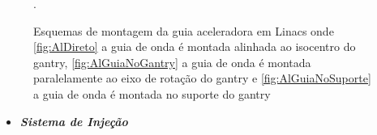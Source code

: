 \documentclass[11pt,a4paper]{article}
\begin{document}
            \begin{figure}[h]
                \centering
                \caption{Esquemas de montagem da guia aceleradora em Linacs onde \ref{fig:AlDireto} a guia de onda é montada alinhada ao isocentro do gantry, \ref{fig:AlGuiaNoGantry} a guia de onda é montada paralelamente ao eixo de rotação do gantry e \ref{fig:AlGuiaNoSuporte} a guia de onda é montada no suporte do gantry}.
                \label{fig:esquemasMontagemGuia}
            \end{figure}

            \begin{itemize}
                \item \textbf{\textit{\textcolor{CarnationPink}{Sistema de Injeção}}}
            \end{itemize}
\end{document}
